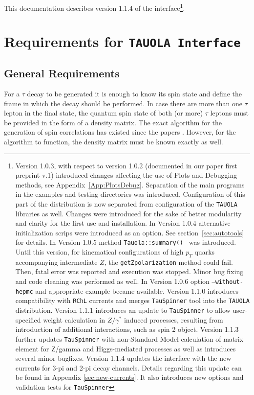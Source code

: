 \documentclass[]{Tauola_interface_design}
\begin{document}
This documentation describes version 1.1.4 of the interface\footnote{Version 1.0.3,
with respect to version 1.0.2 (documented in our paper first preprint v.1)
introduced changes affecting the use of Plots and Debugging methods, see
Appendix~\ref{App:PlotsDebug}. Separation of the main programs in the 
examples and testing directories was introduced. Configuration of this part 
of the distribution is now separated from configuration of the {\tt TAUOLA} 
libraries as well. Changes were introduced for the sake of better modularity
and clarity for the first use and installation. In Version 1.0.4 alternative initialization scrips were introduced 
as an option. See section~\ref{sec:autotools} for details. 
In Version 1.0.5 method {\tt Tauola::summary() } was introduced.
Until this  version, for kinematical configurations
of  high $p_T$ quarks accompanying 
intermediate $Z$, the {\tt getZpolarization} method  could fail. Then,   fatal error was reported 
and  execution was stopped.  Minor  
bug fixing and code cleaning was performed as well.
In Version 1.0.6 option {\tt --without-hepmc} and appropriate example 
became available.
Version 1.1.0 introduces compatibility with {\tt RChL} currents \cite{Shekhovtsova:2012ra} and merges
{\tt TauSpinner} \cite{Czyczula:2012ny} tool into the {\tt TAUOLA} distribution.
Version 1.1.1 introduces an update to {\tt TauSpinner} to allow user-specified
weight calculation in $Z/\gamma^*$ induced processes, resulting from
introduction of additional interactions, such as spin 2 object.
Version 1.1.3 further updates {\tt TauSpinner} with non-Standard Model
calculation of matrix element for Z/gamma and Higgs-mediated processes
as well as introduces several minor bugfixes.
Version 1.1.4 updates the interface with the new currents for 3-pi and 2-pi decay channels.
Details regarding this update can be found in Appendix \ref{sec:new-currents}.
It also introduces new options and validation tests for {\tt TauSpinner}}.

\section{Requirements  for {\tt TAUOLA Interface} }

\subsection{General Requirements}
\label{sect:General}

For a $\tau$ decay to be generated it is enough to know its spin 
state and define the frame in which the decay should be performed. In case there are
more than one $\tau$ lepton in the final state, the quantum spin state of
both (or more) $\tau$ leptons must be provided in the form of a density matrix.
The exact  algorithm for the generation of spin correlations has existed 
since the papers \cite{Jadach:1990mz,Jezabek:1991qp,Jadach:1993hs}. 
However, for the algorithm to function, the density matrix must be known exactly as well.
\end{document}
